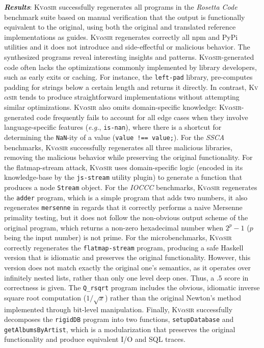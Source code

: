 \documentclass[nonacm,sigplan]{acmart}
\def\eg{{\em e.g.}, }
\newcommand{\sys}{{\scshape Kv{$\alpha$}sir}\xspace}
\newcommand{\heading}[1]{\vspace{2pt}\noindent\textbf{\emph{#1}}:\enspace}
\newcommand{\ttt}[1]{\texttt{#1}\xspace}
\begin{document}
\heading{Results}
\sys successfully regenerates all programs in the \textit{Rosetta Code} benchmark suite
based on manual verification that the output is functionally equivalent
to the original, using both the original and translated reference implementations as guides.
\sys regenerates correctly all npm and PyPi utilities and it does not introduce and side-effectful or malicious behavior.
The synthesized programs reveal interesting insights and patterns.
\sys-generated code often lacks the optimizations commonly
implemented by library developers, such as early exits or caching.
For instance, the \ttt{left-pad} library, pre-computes padding for strings below a certain length
and returns it directly.
In contrast, \sys tends to produce straightforward
implementations without attempting similar optimizations.
\sys also omits domain-specific knowledge:
\sys-generated code frequently fails to account for all edge cases when they involve language-specific features (\eg \ttt{is-nan}), where there is a shortcut for determining 
the \ttt{NaN}-ity of a value (\ttt{value !== value;}).
For the \textit{SSCA} benchmarks, \sys successfully regenerates all three malicious libraries, removing the malicious behavior while preserving the original functionality.
For the flatmap-stream attack, \sys uses domain-specific logic (encoded in its knowledge-base by the \ttt{js-stream} utility plugin) to generate a function that produces a node \ttt{Stream} object.
For the \textit{IOCCC} benchmarks, \sys regenerates the \ttt{adder} program, which is a simple program that adds two numbers,
it also regenerates \ttt{mersenne} in regards that it correctly performs a naive Mersenne primality testing, but it does not follow the non-obvious output scheme of the original program, which returns a non-zero hexadecimal number when $2^p - 1$ ($p$ being the input number) is not prime.
For the microbenchmarks, \sys correctly regenerates the \ttt{flatmap-stream} program, producing a safe Haskell version that is idiomatic and preserves the original functionality.
However, this version does not match exactly the original one's semantics, as it operates over infinitely nested lists, rather than only one level deep ones.
Thus, a $.5$ score in correctness is given.
The \ttt{Q\_rsqrt} program includes the obvious, idiomatic inverse square root computation ($1/\sqrt{x}$) rather than the original Newton's method implemented through bit-level manipulation.
Finally, \sys successfully decomposes the \ttt{rigidDB} program into two
functions, \ttt{setupDatabase} and \ttt{getAlbumsByArtist}, which is a
modularization that preserves the original functionality and produce equivalent I/O and SQL traces.
\end{document}
